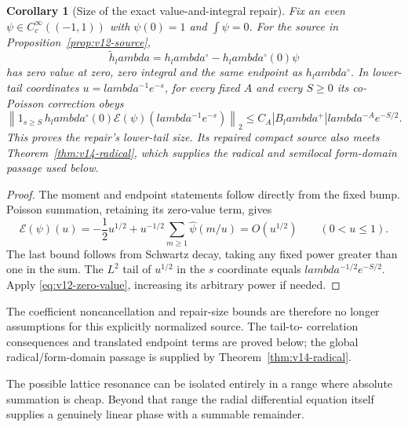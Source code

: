 \documentclass[11pt]{article}
\def\lambda{lambda}%
\newtheorem{corollary}[theorem]{Corollary}
\theoremstyle{remark}
\begin{document}
\begin{corollary}[Size of the exact value-and-integral repair]
\label{cor:v12-repair}
Fix an even $\psi\in C_c^\infty((-1,1))$ with $\psi(0)=1$ and
$\int\psi=0$. For the source in Proposition~\ref{prop:v12-source},
\[
 \widetilde h_\lambda=h_\lambda^\circ-h_\lambda^\circ(0)\psi
\]
has zero value at zero, zero integral and the same endpoint as
$h_\lambda^\circ$. In lower-tail coordinates $u=\lambda^{-1}e^{-s}$,
for every fixed $A$ and every $S\ge0$ its co-Poisson correction obeys
\begin{equation}\label{eq:v12-repair-tail}
 \left\|1_{s\ge S}\,h_\lambda^\circ(0)
            \mathcal E(\psi)(\lambda^{-1}e^{-s})\right\|_2
     \le C_A |B_\lambda^+|\lambda^{-A}e^{-S/2}.
\end{equation}
This proves the repair's lower-tail size. Its repaired compact source
also meets Theorem~\ref{thm:v14-radical}, which supplies the radical and
semilocal form-domain passage used below.
\end{corollary}
\begin{proof}
The moment and endpoint statements follow directly from the fixed bump.
Poisson summation, retaining its zero-value term, gives
\[
 \mathcal E(\psi)(u)=-\frac12u^{1/2}
           +u^{-1/2}\sum_{m\ge1}\widehat\psi(m/u)=O(u^{1/2})
       \qquad(0<u\le1).
\]
The last bound follows from Schwartz decay, taking any fixed power
greater than one in the sum. The $L^2$ tail of $u^{1/2}$ in the
$s$ coordinate equals $\lambda^{-1/2}e^{-S/2}$. Apply
\eqref{eq:v12-zero-value}, increasing its arbitrary power if needed.
\end{proof}

The coefficient noncancellation and repair-size bounds are therefore no
longer assumptions for this explicitly normalized source. The tail-to-
correlation consequences and translated endpoint terms are proved below;
the global radical/form-domain passage is supplied by
Theorem~\ref{thm:v14-radical}.


The possible lattice resonance can be isolated entirely in a range where absolute summation is cheap.  Beyond that range the radial differential equation itself supplies a genuinely linear phase with a summable remainder.
\end{document}
